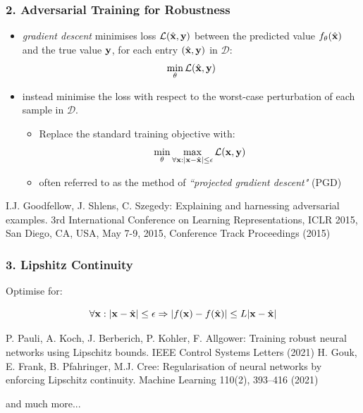 \documentclass[aspectratio=169]{beamer}
\newcommand{\distance}[2]{|#1 - #2|}
\newcommand{\xs}{\x} 			%
\begin{document}
 

\begin{frame}
  \frametitle{2. Adversarial Training  for Robustness}

  \begin{itemize}
  \item  \emph{gradient descent}  minimises loss $\mathcal{L}(\hat{\mathbf{x}}, \mathbf{y})$ between the predicted value $f_{\theta}(\hat{\mathbf{x}})$ and the true value $\mathbf{y}$, for each entry $(\hat{\mathbf{x}}, \mathbf{y})$ in $\mathcal{D}$:  
  $$ \min_{\theta} \mathcal{L}(\hat{\mathbf{x}}, \mathbf{y}) $$
  \pause
  \item instead minimise the loss with respect to the worst-case perturbation of each sample in $\mathcal{D}$.
\begin{itemize}
     \item Replace the standard training objective with:
$$\min_{\theta} \max_{\forall \xs : \distance{\xs}{\xt} \leq \epsilon} \lossfn(\xs, \y)$$
 \item often referred to as the method of \emph{``projected gradient descent"} (PGD)

\end{itemize}
\end{itemize}

 {\scriptsize
   \begin{thebibliography}{99}
        \beamertemplatearticlebibitems
I.J. Goodfellow, J. Shlens, C. Szegedy: Explaining and harnessing adversarial examples. 3rd International Conference on Learning Representations,
ICLR 2015, San Diego, CA, USA, May 7-9, 2015, Conference Track Proceedings (2015)
 \end{thebibliography}}

\end{frame}


    \begin{frame}
      \frametitle{3. Lipshitz Continuity}

      Optimise for: 
      
  \begin{equation*}
    \label{eq:lipschitz-robustness}
    \forall \xs: \distance{\xs}{\xt} \leq \epsilon \Rightarrow \distance{f(\xs)}{f(\xt)} \leq L \distance{\xs}{\xt}
  \end{equation*}

   {\scriptsize
   \begin{thebibliography}{99}
        \beamertemplatearticlebibitems
P. Pauli, A. Koch, J. Berberich, P. Kohler, F. Allgower: Training robust neural networks
using Lipschitz bounds. IEEE Control Systems Letters (2021)
 H. Gouk, E. Frank, B. Pfahringer, M.J. Cree: Regularisation of neural networks by enforcing Lipschitz continuity. Machine Learning 110(2), 393–416 (2021)
\end{thebibliography}}


and much more...

    \end{frame}
\end{document}
